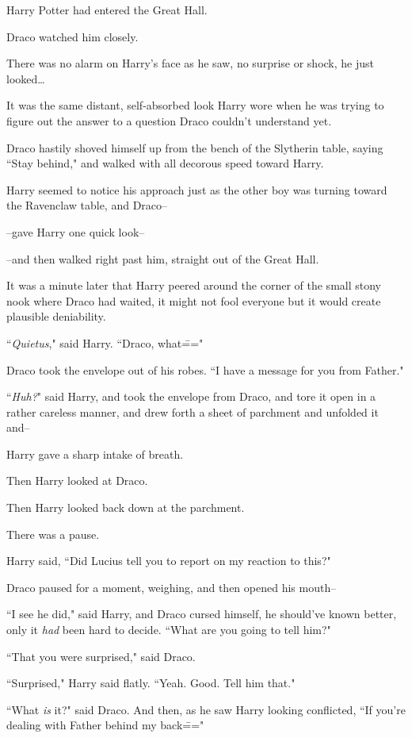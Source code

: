 Harry Potter had entered the Great Hall.

Draco watched him closely.

There was no alarm on Harry's face as he saw, no surprise or shock, he just looked{\ldots}

It was the same distant, self-absorbed look Harry wore when he was trying to figure out the answer to a question Draco couldn't understand yet.

Draco hastily shoved himself up from the bench of the Slytherin table, saying ``Stay behind," and walked with all decorous speed toward Harry.

Harry seemed to notice his approach just as the other boy was turning toward the Ravenclaw table, and Draco\---

\---gave Harry one quick look\---

\---and then walked right past him, straight out of the Great Hall.

It was a minute later that Harry peered around the corner of the small stony nook where Draco had waited, it might not fool everyone but it would create plausible deniability.

``\emph{Quietus}," said Harry. ``Draco, what\==="

Draco took the envelope out of his robes. ``I have a message for you from Father."

``\emph{Huh?}" said Harry, and took the envelope from Draco, and tore it open in a rather careless manner, and drew forth a sheet of parchment and unfolded it and\---

Harry gave a sharp intake of breath.

Then Harry looked at Draco.

Then Harry looked back down at the parchment.

There was a pause.

Harry said, ``Did Lucius tell you to report on my reaction to this?"

Draco paused for a moment, weighing, and then opened his mouth\---

``I see he did," said Harry, and Draco cursed himself, he should've known better, only it \emph{had} been hard to decide. ``What are you going to tell him?"

``That you were surprised," said Draco.

``Surprised," Harry said flatly. ``Yeah. Good. Tell him that."

``What \emph{is} it?" said Draco. And then, as he saw Harry looking conflicted, ``If you're dealing with Father behind my back\==="

